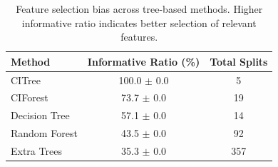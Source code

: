 \begin{table}[h]
\centering
\caption{Feature selection bias across tree-based methods. Higher informative ratio indicates better selection of relevant features.}
\label{tab:feature_selection_bias}
\begin{tabular}{lcc}
\toprule
Method & Informative Ratio (\%) & Total Splits \\
\midrule
CITree & 100.0 $\pm$ 0.0 & 5 \\
CIForest & 73.7 $\pm$ 0.0 & 19 \\
Decision Tree & 57.1 $\pm$ 0.0 & 14 \\
Random Forest & 43.5 $\pm$ 0.0 & 92 \\
Extra Trees & 35.3 $\pm$ 0.0 & 357 \\
\bottomrule
\end{tabular}
\end{table}
